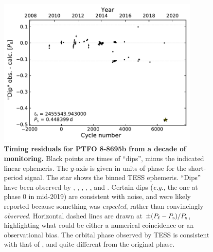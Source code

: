 \documentclass[12pt,twocolumn,tighten]{aastex62}
\begin{document}
\begin{figure}[t]
	\begin{center}
		\leavevmode
		\includegraphics[width=0.9\textwidth]{f4.pdf}
	\end{center}
	\vspace{-0.7cm}
	\caption{
    {\bf Timing residuals for PTFO 8-8695b from a decade of monitoring.}
		Black points are times of ``dips'', minus the indicated linear ephemeris.
    The $y$-axis is given in units of phase for the
    short-period signal.
    The star shows the binned TESS ephemeris.
		``Dips'' have been observed by
		\citet{van_eyken_ptf_2012}, \citet{ciardi_follow-up_2015},
		\citet{yu_tests_2015}, \citet{raetz_yeti_2016},
		\citet{onitsuka_multi-color_2017}, and \citet{tanimoto_evidence_2020}.
    Certain dips ({\it e.g.}, the one at phase 0 in mid-2019) are
    consistent with noise, and were likely reported because
    something was {\it expected}, rather than convincingly {\it
    observed}.
    Horizontal dashed lines are drawn at $\pm (P_{\rm \ell} - P_{\rm s})/P_{\rm s}$,
    highlighting what could be either a numerical coincidence or an observational
    bias.
    The orbital phase observed by TESS is consistent with that of \citet{tanimoto_evidence_2020}, and quite different from the original phase.
		\label{fig:o_minus_c}
	}
\end{figure}
\end{document}
